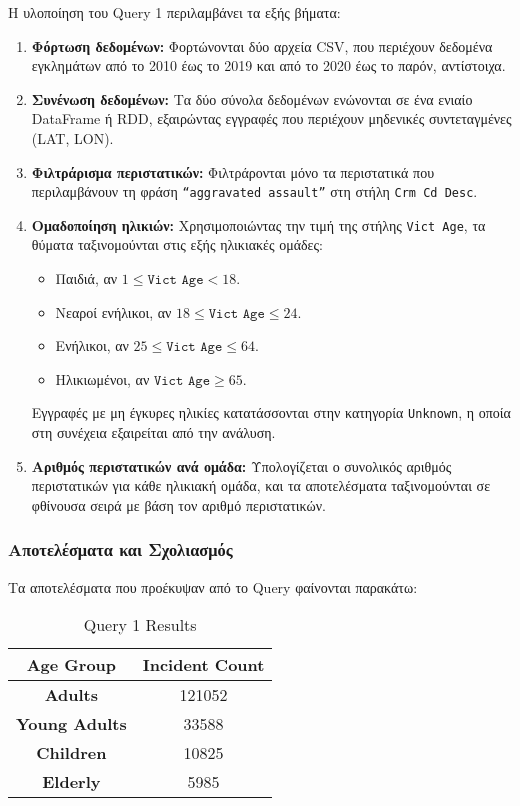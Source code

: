 \documentclass{article}
\begin{document}
Η υλοποίηση του Query 1 περιλαμβάνει τα εξής βήματα:
\begin{enumerate}
    \item \textbf{Φόρτωση δεδομένων:} Φορτώνονται δύο αρχεία CSV, που περιέχουν δεδομένα εγκλημάτων από το 2010 έως το 2019 και από το 2020 έως το παρόν, αντίστοιχα. 
    \item \textbf{Συνένωση δεδομένων:} Τα δύο σύνολα δεδομένων ενώνονται σε ένα ενιαίο DataFrame ή RDD, εξαιρώντας εγγραφές που περιέχουν μηδενικές συντεταγμένες (LAT, LON).
    \item \textbf{Φιλτράρισμα περιστατικών:} Φιλτράρονται μόνο τα περιστατικά που περιλαμβάνουν τη φράση \texttt{“aggravated assault”} στη στήλη \texttt{Crm Cd Desc}.
    \item \textbf{Ομαδοποίηση ηλικιών:} Χρησιμοποιώντας την τιμή της στήλης \texttt{Vict Age}, τα θύματα ταξινομούνται στις εξής ηλικιακές ομάδες:
          \begin{itemize}
              \item Παιδιά, αν $1 \leq \texttt{Vict Age} < 18$.
              \item Νεαροί ενήλικοι, αν $18 \leq \texttt{Vict Age} \leq 24$.
              \item Ενήλικοι, αν $25 \leq \texttt{Vict Age} \leq 64$.
              \item Ηλικιωμένοι, αν $\texttt{Vict Age} \geq 65$.
          \end{itemize}
          Εγγραφές με μη έγκυρες ηλικίες κατατάσσονται στην κατηγορία \texttt{Unknown}, η οποία στη συνέχεια εξαιρείται από την ανάλυση.
    \item \textbf{Αριθμός περιστατικών ανά ομάδα:} Υπολογίζεται ο συνολικός αριθμός περιστατικών για κάθε ηλικιακή ομάδα, και τα αποτελέσματα ταξινομούνται σε φθίνουσα σειρά με βάση τον αριθμό περιστατικών.
\end{enumerate}
\subsubsection*{Αποτελέσματα και Σχολιασμός}
Τα αποτελέσματα που προέκυψαν από το Query φαίνονται παρακάτω: \\
\begin{table}[H]
\centering
\caption{Query 1 Results}
\label{tab:query1_results}
\begin{tabular}{|c|c|}
\hline
\textbf{Age Group}		& 		\textbf{Incident Count}	\\ \hline
\textbf{Adults}			&		121052					\\ \hline
\textbf{Young Adults}	&		33588					\\ \hline
\textbf{Children}      		&		10825					\\ \hline
\textbf{Elderly}			&		5985					\\ \hline
\end{tabular}
\end{table}
\end{document}
